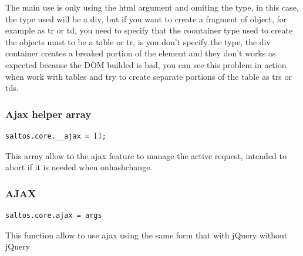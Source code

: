 \documentclass[a4paper]{article}
\begin{document}
The main use is only using the html argument and omiting the type, in this case, the
type used will be a div, but if you want to create a fragment of object, for example
as tr or td, you need to specify that the coontainer type used to create the objects
must to be a table or tr, is you don't specify the type, the div container creates
a breaked portion of the element and they don't works as expected because the DOM
builded is bad, you can see this problem in action when work with tables and try to
create separate portions of the table as trs or tds.

\hypertarget{toc144}{}
\subsubsection{Ajax helper array}

\begin{lstlisting}
saltos.core.__ajax = [];
\end{lstlisting}

This array allow to the ajax feature to manage the active request, intended to abort
if it is needed when onhashchange.

\hypertarget{toc145}{}
\subsubsection{AJAX}

\begin{lstlisting}
saltos.core.ajax = args
\end{lstlisting}

This function allow to use ajax using the same form that with jQuery without jQuery
\end{document}
